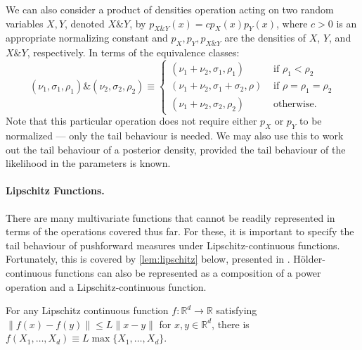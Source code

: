 \documentclass[thesis.tex]{subfiles}
\begin{document}
We can also consider a product of densities operation acting on two random variables $X,Y$, denoted $X \& Y$, by
$p_{X \& Y}(x) = c p_X(x) p_Y(x)$,
where $c > 0$ is an appropriate normalizing constant and $p_X,p_Y,p_{X\& Y}$ are the densities of $X$, $Y$, and $X \& Y$, respectively. In terms of the equivalence classes:
\[
(\nu_1,\sigma_1,\rho_1)\&(\nu_2,\sigma_2,\rho_2) 
\equiv \begin{cases}
(\nu_{1}+\nu_{2},\sigma_{1},\rho_{1}) & \text{ if }\rho_{1}<\rho_{2}\\
(\nu_{1}+\nu_{2},\sigma_{1}+\sigma_{2},\rho) & \text{ if }\rho=\rho_{1}=\rho_{2}\\
(\nu_{1}+\nu_{2},\sigma_{2},\rho_{2}) & \text{ otherwise.}
\end{cases}
\]
Note that this particular operation does not require either $p_X$ or $p_Y$ to be normalized --- only the tail behaviour is needed. We may also use this to work out the tail behaviour of a posterior density, provided the tail behaviour of the likelihood in the parameters is known.

\paragraph{Lipschitz Functions.}

There are many multivariate functions that cannot be readily represented in terms of the operations covered thus far. For these, it is important to specify the tail behaviour of pushforward measures under Lipschitz-continuous functions. Fortunately, this is covered by \cref{lem:lipschitz} below, presented in \cite[Proposition 1.3]{ledoux2001concentration}. 
H\"{o}lder-continuous functions can also be represented as a composition of a power operation and a Lipschitz-continuous function. 
\begin{lemma}\label{lem:lipschitz}
For any Lipschitz continuous function $f:\mathbb{R}^d \to \mathbb{R}$ satisfying $\|f(x)-f(y)\|\leq L\|x -y\|$ for $x,y \in \mathbb{R}^d$, there is $f(X_1,\dots,X_d) \equiv L \max\{X_1,\dots,X_d\}.$
\end{lemma}
\end{document}
